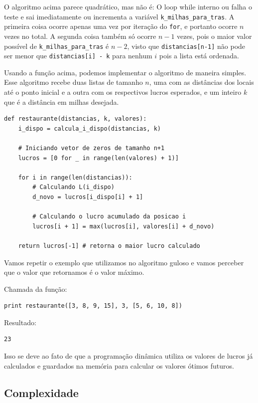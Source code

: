 \documentclass[11pt]{article}
\begin{document}
O algoritmo acima parece quadrático, mas não é: O loop while interno
ou falha o teste e sai imediatamente ou incrementa a variável
\verb~k_milhas_para_tras~. A primeira coisa ocorre apenas uma vez por
iteração do \verb~for~, e portanto ocorre $n$ vezes no total. A segunda
coisa também só ocorre $n-1$ vezes, pois o maior valor possível de
\verb~k_milhas_para_tras~ é $n-2$, visto que \verb~distancias[n-1]~ não pode ser menor
que \verb~distancias[i] - k~ para nenhum $i$ pois a lista está ordenada.

Usando a função acima, podemos implementar o algoritmo de maneira simples.
Esse algoritmo recebe duas listas de tamanho $n$, uma com as distâncias
dos locais até o ponto inicial e a outra com os respectivos lucros
esperados, e um inteiro $k$ que é a distância em milhas desejada.

\begin{verbatim}
def restaurante(distancias, k, valores):
    i_dispo = calcula_i_dispo(distancias, k)

    # Iniciando vetor de zeros de tamanho n+1
    lucros = [0 for _ in range(len(valores) + 1)]

    for i in range(len(distancias)):
        # Calculando L(i_dispo)
        d_novo = lucros[i_dispo[i] + 1]

        # Calculando o lucro acumulado da posicao i
        lucros[i + 1] = max(lucros[i], valores[i] + d_novo)

    return lucros[-1] # retorna o maior lucro calculado
\end{verbatim}

Vamos repetir o exemplo que utilizamos no algoritmo guloso e vamos
perceber que o valor que retornamos é o valor máximo.

Chamada da função:
\begin{verbatim}
print restaurante([3, 8, 9, 15], 3, [5, 6, 10, 8])
\end{verbatim}

Resultado:

\begin{verbatim}
23
\end{verbatim}

Isso se deve ao fato de que a programação dinâmica utiliza os valores
de lucros já calculados e guardados na memória para calcular os
valores ótimos futuros.

\subsection{Complexidade}
\label{sec-3-4}
\label{sec-5}
\end{document}

